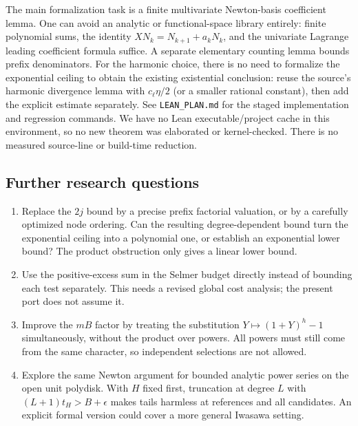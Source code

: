 \documentclass[11pt]{article}
\begin{document}
The main formalization task is a finite multivariate Newton-basis coefficient lemma. One can avoid an analytic or functional-space library entirely: finite polynomial sums, the identity $XN_k=N_{k+1}+a_kN_k$, and the univariate Lagrange leading coefficient formula suffice. A separate elementary counting lemma bounds prefix denominators. For the harmonic choice, there is no need to formalize the exponential ceiling to obtain the existing existential conclusion: reuse the source's harmonic divergence lemma with $c_\ell\eta/2$ (or a smaller rational constant), then add the explicit estimate separately. See \texttt{LEAN\_PLAN.md} for the staged implementation and regression commands. We have no Lean executable/project cache in this environment, so no new theorem was elaborated or kernel-checked. There is no measured source-line or build-time reduction.

\subsection*{Further research questions}
\begin{enumerate}[leftmargin=*]
\item Replace the $2j$ bound by a precise prefix factorial valuation, or by a carefully optimized node ordering. Can the resulting degree-dependent bound turn the exponential ceiling into a polynomial one, or establish an exponential lower bound? The product obstruction only gives a linear lower bound.
\item Use the positive-excess sum in the Selmer budget directly instead of bounding each test separately. This needs a revised global cost analysis; the present port does not assume it.
\item Improve the $mB$ factor by treating the substitution $Y\mapsto(1+Y)^h-1$ simultaneously, without the product over powers. All powers must still come from the same character, so independent selections are not allowed.
\item Explore the same Newton argument for bounded analytic power series on the open unit polydisk. With $H$ fixed first, truncation at degree $L$ with $(L+1)t_H>B+\epsilon$ makes tails harmless at references and all candidates. An explicit formal version could cover a more general Iwasawa setting.
\end{enumerate}
\end{document}
